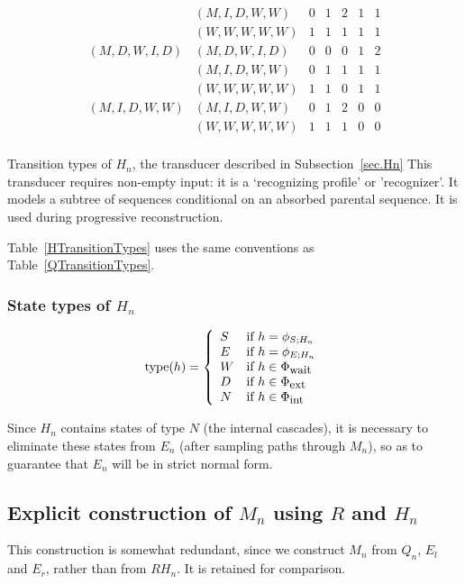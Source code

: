 \documentclass{article}
\newcommand{\secref}[1]{Subsection~\ref{sec.#1}}
\newcommand\compose{}
\newcommand\States{\Phi}
\newcommand\statesof[1]{\States_{#1}}
\newcommand\startstateof[1]{\phi_{S;#1}}
\newcommand\laststateof[1]{\phi_{E;#1}}
\newcommand\statetype{\mbox{type}}
\newcommand\stateset[1]{\statesof{\mbox{\small #1}}}
\newcommand\externalsuffix{ext}
\newcommand\internalsuffix{int}
\newcommand\waitsuffix{wait}
\newcommand\externalcascades{\stateset{\externalsuffix}}
\newcommand\internalcascades{\stateset{\internalsuffix}}
\newcommand\waitstates{\stateset{\waitsuffix}}
\begin{document}
\begin{table}
\[\begin{array}{ll|ccccc}
            & (M,I,D,W,W) & 0 & 1 & 2 & 1 & 1 \\
            & (W,W,W,W,W) & 1 & 1 & 1 & 1 & 1 \\
\hline
(M,D,W,I,D) & (M,D,W,I,D) & 0 & 0 & 0 & 1 & 2 \\
            & (M,I,D,W,W) & 0 & 1 & 1 & 1 & 1 \\
            & (W,W,W,W,W) & 1 & 1 & 0 & 1 & 1 \\
\hline
(M,I,D,W,W) & (M,I,D,W,W) & 0 & 1 & 2 & 0 & 0 \\
            & (W,W,W,W,W) & 1 & 1 & 1 & 0 & 0 \\
\end{array}
\]
\caption{
\label{HTransitionTypes}
Transition types of $H_n$, the transducer described in  \secref{Hn}
 This transducer requires non-empty input: it is
 a `recognizing profile' or 'recognizer'. It  models a subtree of sequences
 conditional on an absorbed parental sequence. 
It is used during progressive reconstruction.}
\end{table}
Table~\ref{HTransitionTypes} uses the same conventions as Table~\ref{QTransitionTypes}.

\subsubsection{State types of $H_n$}

\[
\statetype(h) = \left\{ \begin{array}{ll}
S & \mbox{if $h = \startstateof{H_n}$} \\
E & \mbox{if $h = \laststateof{H_n}$} \\
W & \mbox{if $h \in \waitstates$} \\
D & \mbox{if $h \in \externalcascades$} \\
N & \mbox{if $h \in \internalcascades$}
\end{array} \right.
\]

Since $H_n$ contains states of type $N$ (the internal cascades),
it is necessary to eliminate these states from $E_n$ (after sampling paths through $M_n$),
so as to guarantee that $E_n$ will be in strict normal form.



\subsection{Explicit construction of $M_n$ using $R$ and $H_n$}

This construction is somewhat redundant, since we construct $M_n$ from $Q_n$, $E_l$ and $E_r$, rather than from $R \compose H_n$.
It is retained for comparison.
\end{document}
